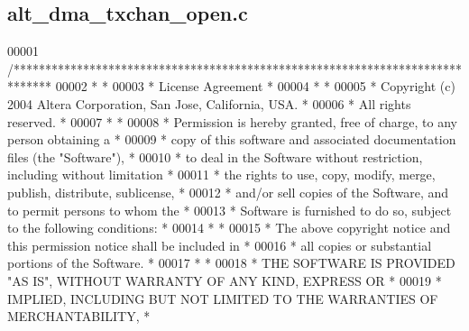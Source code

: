 \subsection{alt\+\_\+dma\+\_\+txchan\+\_\+open.\+c}
\label{alt__dma__txchan__open_8c_source}

\begin{DoxyCode}
00001 \textcolor{comment}{/******************************************************************************}
00002 \textcolor{comment}{*                                                                             *}
00003 \textcolor{comment}{* License Agreement                                                           *}
00004 \textcolor{comment}{*                                                                             *}
00005 \textcolor{comment}{* Copyright (c) 2004 Altera Corporation, San Jose, California, USA.           *}
00006 \textcolor{comment}{* All rights reserved.                                                        *}
00007 \textcolor{comment}{*                                                                             *}
00008 \textcolor{comment}{* Permission is hereby granted, free of charge, to any person obtaining a     *}
00009 \textcolor{comment}{* copy of this software and associated documentation files (the "Software"),  *}
00010 \textcolor{comment}{* to deal in the Software without restriction, including without limitation   *}
00011 \textcolor{comment}{* the rights to use, copy, modify, merge, publish, distribute, sublicense,    *}
00012 \textcolor{comment}{* and/or sell copies of the Software, and to permit persons to whom the       *}
00013 \textcolor{comment}{* Software is furnished to do so, subject to the following conditions:        *}
00014 \textcolor{comment}{*                                                                             *}
00015 \textcolor{comment}{* The above copyright notice and this permission notice shall be included in  *}
00016 \textcolor{comment}{* all copies or substantial portions of the Software.                         *}
00017 \textcolor{comment}{*                                                                             *}
00018 \textcolor{comment}{* THE SOFTWARE IS PROVIDED "AS IS", WITHOUT WARRANTY OF ANY KIND, EXPRESS OR  *}
00019 \textcolor{comment}{* IMPLIED, INCLUDING BUT NOT LIMITED TO THE WARRANTIES OF MERCHANTABILITY,    *}

\end{DoxyCode}
